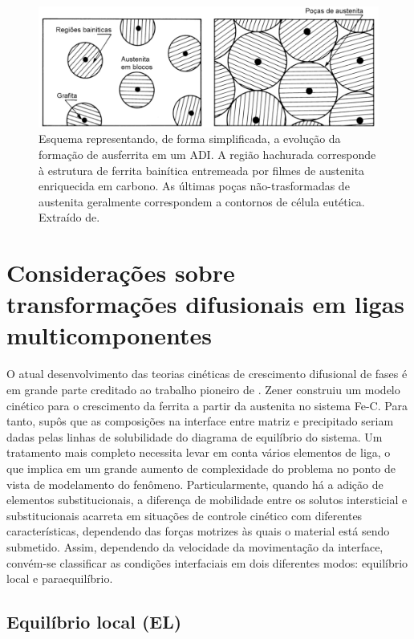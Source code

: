 \begin{figure}
	\includegraphics[width=16cm]{img/crescimentoAusferrita.pdf}
	\caption{Esquema representando, de forma simplificada, a evolução da formação de ausferrita em um ADI. A região hachurada corresponde à estrutura de ferrita bainítica entremeada por filmes de austenita enriquecida em carbono. As últimas poças não-trasformadas de austenita geralmente correspondem a contornos de célula eutética. Extraído de\cite{Aranzabal1997}.}
	\label{fig:cineticaADI}
\end{figure}


\section{Considera\c{c}\~{o}es sobre transforma\c{c}\~{o}es difusionais em ligas multicomponentes}

\label{sec:consTransf}

O atual desenvolvimento das teorias cinéticas de crescimento difusional de fases é em grande parte creditado ao trabalho pioneiro de . Zener construiu um modelo cinético para o crescimento da ferrita a partir da austenita no sistema Fe-C. Para tanto, supôs que as composições na interface entre matriz e precipitado seriam dadas pelas linhas de solubilidade do diagrama de equilíbrio do sistema. Um tratamento mais completo necessita levar em conta vários elementos de liga, o que implica em um grande aumento de complexidade do problema no ponto de vista de modelamento do fenômeno. Particularmente, quando há a adição de elementos substitucionais, a diferença de mobilidade entre os solutos intersticial e substitucionais acarreta em situações de controle cinético com diferentes características, dependendo das forças motrizes às quais o material está sendo submetido. Assim, dependendo da velocidade da movimentação da interface, convém-se classificar as condições interfaciais em dois diferentes modos: equilíbrio local e paraequilíbrio.

\subsection{Equilíbrio local (EL)}
	
